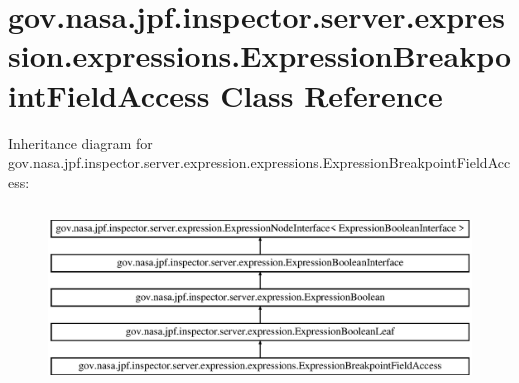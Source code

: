 \hypertarget{classgov_1_1nasa_1_1jpf_1_1inspector_1_1server_1_1expression_1_1expressions_1_1_expression_breakpoint_field_access}{}\section{gov.\+nasa.\+jpf.\+inspector.\+server.\+expression.\+expressions.\+Expression\+Breakpoint\+Field\+Access Class Reference}
\label{classgov_1_1nasa_1_1jpf_1_1inspector_1_1server_1_1expression_1_1expressions_1_1_expression_breakpoint_field_access}
Inheritance diagram for gov.\+nasa.\+jpf.\+inspector.\+server.\+expression.\+expressions.\+Expression\+Breakpoint\+Field\+Access\+:\begin{figure}[H]
\begin{center}
\leavevmode
\includegraphics[height=4.827586cm]{classgov_1_1nasa_1_1jpf_1_1inspector_1_1server_1_1expression_1_1expressions_1_1_expression_breakpoint_field_access}
\end{center}
\end{figure}
